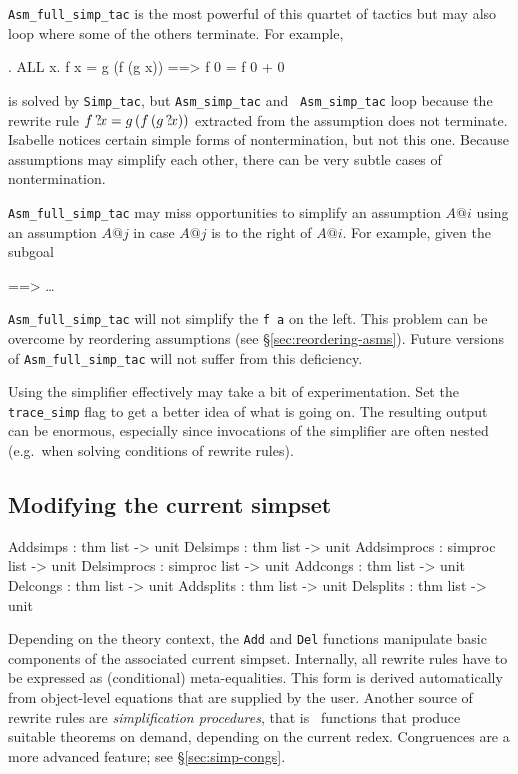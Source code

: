 \medskip \texttt{Asm_full_simp_tac} is the most powerful of this quartet
of tactics but may also loop where some of the others terminate.  For
example,
\begin{ttbox}
{. ALL x. f x = g (f (g x)) ==> f 0 = f 0 + 0}
\end{ttbox}
is solved by \texttt{Simp_tac}, but \texttt{Asm_simp_tac} and {\tt
  Asm_simp_tac} loop because the rewrite rule $f\,{?\!x} =
g\,(f\,(g\,{?\!x}))$ extracted from the assumption does not
terminate.  Isabelle notices certain simple forms of nontermination,
but not this one. Because assumptions may simplify each other, there can be
very subtle cases of nontermination.
 
\begin{warn}
  \verb$Asm_full_simp_tac$ may miss opportunities to simplify an assumption
  $A@i$ using an assumption $A@j$ in case $A@j$ is to the right of $A@i$.
  For example, given the subgoal
\begin{ttbox}
{\out [| \dots f a \dots; P a; ALL x. P x --> f x = g x |] ==> \dots}
\end{ttbox}
\verb$Asm_full_simp_tac$ will not simplify the \texttt{f a} on the left.
This problem can be overcome by reordering assumptions (see
\S\ref{sec:reordering-asms}). Future versions of \verb$Asm_full_simp_tac$
will not suffer from this deficiency.
\end{warn}

\medskip

Using the simplifier effectively may take a bit of experimentation.
Set the \verb$trace_simp$ flag to get
a better idea of what is going on.  The resulting output can be
enormous, especially since invocations of the simplifier are often
nested (e.g.\ when solving conditions of rewrite rules).


\subsection{Modifying the current simpset}
\begin{ttbox}
Addsimps    : thm list -> unit
Delsimps    : thm list -> unit
Addsimprocs : simproc list -> unit
Delsimprocs : simproc list -> unit
Addcongs    : thm list -> unit
Delcongs    : thm list -> unit
Addsplits   : thm list -> unit
Delsplits   : thm list -> unit
\end{ttbox}

Depending on the theory context, the \texttt{Add} and \texttt{Del}
functions manipulate basic components of the associated current
simpset.  Internally, all rewrite rules have to be expressed as
(conditional) meta-equalities.  This form is derived automatically
from object-level equations that are supplied by the user.  Another
source of rewrite rules are \emph{simplification procedures}, that is
\ML\ functions that produce suitable theorems on demand, depending on
the current redex.  Congruences are a more advanced feature; see
\S\ref{sec:simp-congs}.


